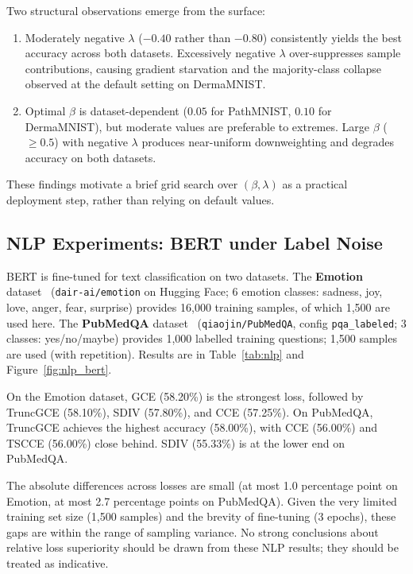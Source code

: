 Two structural observations emerge from the surface:
\begin{enumerate}[leftmargin=*,itemsep=2pt]
  \item Moderately negative $\lambda$ ($-0.40$ rather than $-0.80$)
        consistently yields the best accuracy across both datasets.
        Excessively negative $\lambda$ over-suppresses sample contributions,
        causing gradient starvation and the majority-class collapse observed
        at the default setting on DermaMNIST.
  \item Optimal $\beta$ is dataset-dependent ($0.05$ for PathMNIST,
        $0.10$ for DermaMNIST), but moderate values are preferable to
        extremes.
        Large $\beta$ ($\geq0.5$) with negative $\lambda$ produces near-uniform
        downweighting and degrades accuracy on both datasets.
\end{enumerate}
These findings motivate a brief grid search over $(\beta, \lambda)$ as
a practical deployment step, rather than relying on default values.

\subsection{NLP Experiments: BERT under Label Noise}
\label{sec:nlp}

BERT is fine-tuned for text classification on two datasets.
The \textbf{Emotion} dataset~\citep{saravia2018} (\texttt{dair-ai/emotion} on
Hugging Face; 6 emotion classes: sadness, joy, love, anger, fear, surprise)
provides 16{,}000 training samples, of which 1{,}500 are used here.
The \textbf{PubMedQA} dataset~\citep{jin2019pubmedqa} (\texttt{qiaojin/PubMedQA},
config \texttt{pqa\_labeled}; 3 classes: yes/no/maybe) provides 1{,}000 labelled
training questions; 1{,}500 samples are used (with repetition).
Results are in Table~\ref{tab:nlp} and Figure~\ref{fig:nlp_bert}.

On the Emotion dataset, GCE (58.20\%) is the strongest loss, followed by
TruncGCE (58.10\%), SDIV (57.80\%), and CCE (57.25\%).
On PubMedQA, TruncGCE achieves the highest accuracy (58.00\%), with
CCE (56.00\%) and TSCCE (56.00\%) close behind.
SDIV (55.33\%) is at the lower end on PubMedQA.

The absolute differences across losses are small (at most 1.0 percentage point on Emotion,
at most 2.7 percentage points on PubMedQA).
Given the very limited training set size (1{,}500 samples) and the brevity
of fine-tuning (3 epochs), these gaps are within the range of sampling
variance.
No strong conclusions about relative loss superiority should be drawn from
these NLP results; they should be treated as indicative.

